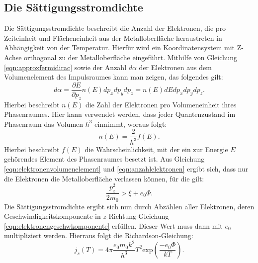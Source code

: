 \subsection{Die Sättigungsstromdichte}
\label{sec:sättstromd}
Die Sättigungsstromdichte beschreibt die Anzahl der Elektronen, die pro Zeiteinheit
und Flächeneinheit aus der Metalloberfläche heraustreten in Abhängigkeit von
der Temperatur. Hierfür wird ein Koordinatensystem mit Z-Achse orthogonal zu der
Metalloberfläche eingeführt. Mithilfe von Gleichung \eqref{eqn:approxfermidirac}
sowie der Anzahl $d\alpha$ der Elektronen aus dem Volumenelement des Impulsraumes
kann man zeigen, das folgendes gilt:
\begin{equation}
    d\alpha = \frac{\partial E}{\partial p_z} n(E) dp_x dp_y
    dp_z = n(E) dE dp_x dp_y dp_z.
    \label{eqn:elektronenvolumenelement}
\end{equation}
Hierbei beschreibt $n(E)$ die Zahl der Elektronen pro Volumeneinheit ihres
Phasenraumes. Hier kann verwendet werden, dass jeder Quantenzustand im Phasenraum
das Volumen $h^3$ einnimmt, woraus folgt:
\begin{equation}
    n(E) = \frac{2}{h^3}f(E).
    \label{eqn:anzahlelektronen}
\end{equation}
Hierbei beschreibt $f(E)$ die Wahrscheinlichkeit, mit der ein zur Energie $E$
gehörendes Element des Phasenraumes besetzt ist.
Aus Gleichung \eqref{eqn:elektronenvolumenelement} und \eqref{eqn:anzahlelektronen}
ergibt sich, dass nur die Elektronen die Metalloberfläche verlassen können, für
die gilt:
\begin{equation}
    \frac{p_z^2}{2 m_0} > \xi + e_0 \Phi.
    \label{eqn:elektronengeschwkomponente}
\end{equation}
Die Sättigungsstromdichte ergibt sich nun durch Abzählen aller Elektronen,
deren Geschwindigkeitskomponente in $z$-Richtung Gleichung
\eqref{eqn:elektronengeschwkomponente} erfüllen. Dieser Wert muss dann mit $e_0$
multipliziert werden. Hierraus folgt die Richardson-Gleichung:
\begin{equation}
    j_s(T) = 4 \pi \frac{e_0 m_0 k^2}{h^3}T^2 \text{exp}\left(\frac{-e_0 \Phi}{k T}\right).
    \label{eqn:richardson}
\end{equation}

